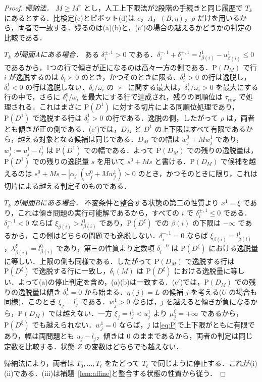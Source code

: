 \documentclass[11pt,a4paper]{ltjsarticle}
\theoremstyle{plain}
\theoremstyle{definition}
\theoremstyle{remark}
\newcommand{\Pb}{\mathrm{P}}
\begin{document}
\begin{proof}
\emph{帰納法．} $M\ge M^\dagger$ とし，人工上下限法が2段階の手続きと同じ履歴で $T_k$ にあるとする．比検定(c)とピボット(d)は $c$，$A$，$(B,\eta)$，$\rho$ だけを用いるから，両者で一致する．残るのは(a)(b)と，(c$'$)の場合の越えるかどうかの判定の比較である．

\emph{$T_k$ が局面Aにある場合．} ある $\delta^{\pm,1}_i>0$ である．$\delta^{-,1}_i+\delta^{+,1}_i=l^1_{\beta(i)}-u^1_{\beta(i)}\le0$ であるから，1つの行で傾きが正になるのは高々一方の側である．$\Pb(D_M)$ で行 $i$ が逸脱するのは $\delta_i\succ0$ のとき，かつそのときに限る．$\delta^1_i>0$ の行は逸脱し，$\delta_i^1<0$ の行は逸脱しない．$\delta_i/\omega_i$ の $\succ$ に関する最大は，$\delta^1_i/\omega_i>0$ を最大にする行の中で，さらに $\delta^0_i/\omega_i$ を最大にする行で達成され，残りの同順位は $\tau_{\mathrm{row}}$ で処理される．これはまさに $\Pb(D^1)$ に対する切片による同順位処理であり，$\Pb(D^1)$ で逸脱する行は $\delta^1_i>0$ の行である．逸脱の側，したがって $\rho$ は，両者とも傾きが正の側である．(c$'$)では，$D_M$ と $D^1$ の上下限はすべて有限であるから，越える対象となる候補は同じである．$D_M$ での幅は $w^0_j+Mw^1_j$ であり，$w^1_j:=u^1_j-l^1_j$ は $\Pb(D^1)$ での幅である．よって $\Pb(D_M)$ での残りの逸脱量は，$\Pb(D^1)$ での残りの逸脱量 $s$ を用いて $s^0+Ms$ と書ける．$\Pb(D_M)$ で候補を越えるのは $s^0+Ms-|\alpha_j|(w^0_j+Mw^1_j)\succ0$ のとき，かつそのときに限り，これは切片による越える判定そのものである．

\emph{$T_k$ が局面Bにある場合．} 不変条件と整合する状態の第二の性質より $x^1=\xi$ であり，これは傾き問題の実行可能解であるから，すべての $i$ で $\delta^{\pm,1}_i\le0$ である．$\delta^{-,1}_i<0$ ならば $\xi_{\beta(i)}>l^1_{\beta(i)}$ であり，$\Pb(D^\xi)$ での $\beta(i)$ の下限は $-\infty$ であるから，この側はどちらの問題でも逸脱しない．$\delta^{-,1}_i=0$ ならば $\xi_{\beta(i)}=l^1_{\beta(i)}$，$\lambda^\xi_{\beta(i)}=l^0_{\beta(i)}$ であり，第三の性質より定数項 $\delta^{-,0}_i$ は $\Pb(D^\xi)$ における逸脱量に等しい．上限の側も同様である．したがって $\Pb(D_M)$ で逸脱する行は $\Pb(D^\xi)$ で逸脱する行に一致し，$\delta_i(M)$ は $\Pb(D^\xi)$ における逸脱量に等しい．よって(a)の停止判定を含め，(a)(b)は一致する．(c$'$)では，$\Pb(D_M)$ での残りの逸脱量は傾き $\delta^1_r=0$ から始まる．$\eta(j)=L$ の候補 $j$ を考える($U$ の場合も同様)．このとき $\xi_j=l^1_j$ である．$w^1_j>0$ ならば，$j$ を越えると傾きが負になるから，$\Pb(D_M)$ では越えない．一方 $\xi_j=l^1_j<u^1_j$ より $\mu^\xi_j=+\infty$ であるから，$\Pb(D^\xi)$ でも越えられない．$w^1_j=0$ ならば，$j$ は\eqref{eq:P}で上下限がともに有限であり，幅は両問題とも $u_j-l_j$，傾きは $0$ のままであるから，両者の判定は同じ定数を比較する．状態 $Z$ の変数はどちらでも越えない．

帰納法により，両者は $T_0,\dots,T_\ell$ をたどって $T_\ell$ で同じように停止する．これが(i)(ii)である．(iii)は補題~\ref{lem:affine}と整合する状態の性質から従う．
\end{proof}
\end{document}
